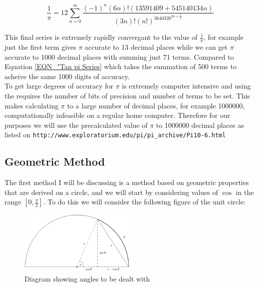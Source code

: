 \begin{equation}
\frac{1}{\pi} = 12\sum_{n=0}^\infty \frac{(-1)^n(6n)!(13591409 + 545140134n)}{(3n)!(n!)^3640320^{3n + \frac{3}{2}}}
\end{equation}

This final series is extremely rapidly convergant to the value of \(\frac{1}{\pi}\), for example just the first term gives \(\pi\) accurate to 13 decimal places while we can get \(\pi\) accurate to 1000 decimal places with summing just 71 terms. Compared to Equation \ref{EQN_"Tan pi Series} which takes the summation of 500 terms to acheive the same 1000 digits of accuracy.\\

To get large degrees of accuracy for \(\pi\) is extremely computer intensive and using the  requires the number of bits of precision and number of terms to be set. This makes calculating \(\pi\) to a large number of decimal places, for example 1000000, computationally infeasible on a regular home computer. Therefore for our purposes we will use the precalculated value of \(\pi\) to 1000000 decimal places as listed on \texttt{http://www.exploratorium.edu/pi/pi\_archive/Pi10-6.html}

\subsection{Geometric Method}
\label{SUB_"Trig Geometric Method"}

\theoremstyle{plain}
\newtheorem{Geo Trig Prop 1}{Proposition}[subsection]
\newtheorem{Geo Trig Prop 2}[Geo Trig Prop 1]{Proposition}
\newtheorem{Geo Trig Prop 3}[Geo Trig Prop 1]{Proposition}

The first method I will be discussing is a method based on geometric properties that are derived on a circle, and we will start by considering values of \(\cos\) in the range \([0, \frac{\pi}{2}]\). To do this we will consider the following figure of the unit circle:

\begin{figure}[!ht]
	\label{FIG_"Geometric Trig 1"}
	\caption{Diagram showing angles to be dealt with}
	\centering
	\includegraphics[width=0.5\textwidth]{"./Diagrams/Geometric Trig Diagram 1"}
\end{figure}

